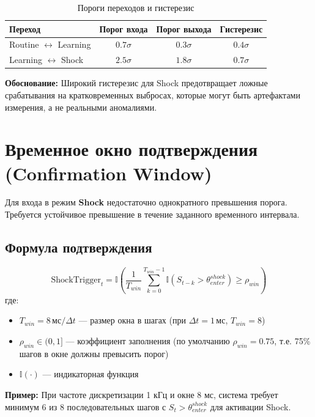 \begin{table}[h]
\centering
\caption{Пороги переходов и гистерезис}
\label{tab:thresholds}
\begin{tabular}{lccc}
\toprule
\textbf{Переход} & \textbf{Порог входа} & \textbf{Порог выхода} & \textbf{Гистерезис} \\
\midrule
Routine $\leftrightarrow$ Learning & $0.7\sigma$ & $0.3\sigma$ & $0.4\sigma$ \\
Learning $\leftrightarrow$ Shock & $2.5\sigma$ & $1.8\sigma$ & $0.7\sigma$ \\
\bottomrule
\end{tabular}
\end{table}

\textbf{Обоснование:} Широкий гистерезис для Shock предотвращает ложные срабатывания на кратковременных выбросах, которые могут быть артефактами измерения, а не реальными аномалиями.

\section{Временное окно подтверждения (Confirmation Window)}
\label{subsec:confirmation_window}

Для входа в режим \textbf{Shock} недостаточно однократного превышения порога. Требуется устойчивое превышение в течение заданного временного интервала.

\subsection{Формула подтверждения}

\begin{equation}
\text{ShockTrigger}_t = \mathbb{I}\left(\frac{1}{T_{win}} \sum_{k=0}^{T_{win}-1} \mathbb{I}(S_{t-k} > \theta_{enter}^{shock}) \geq \rho_{win}\right)
\label{eq:shock_confirmation}
\end{equation}
где:
\begin{itemize}
    \item $T_{win} = 8 \, \text{мс} / \Delta t$ — размер окна в шагах (при $\Delta t = 1 \, \text{мс}$, $T_{win} = 8$)
    \item $\rho_{win} \in (0, 1]$ — коэффициент заполнения (по умолчанию $\rho_{win} = 0.75$, т.е. 75\% шагов в окне должны превысить порог)
    \item $\mathbb{I}(\cdot)$ — индикаторная функция
\end{itemize}

\textbf{Пример:} При частоте дискретизации 1 кГц и окне 8 мс, система требует минимум 6 из 8 последовательных шагов с $S_t > \theta_{enter}^{shock}$ для активации Shock.

